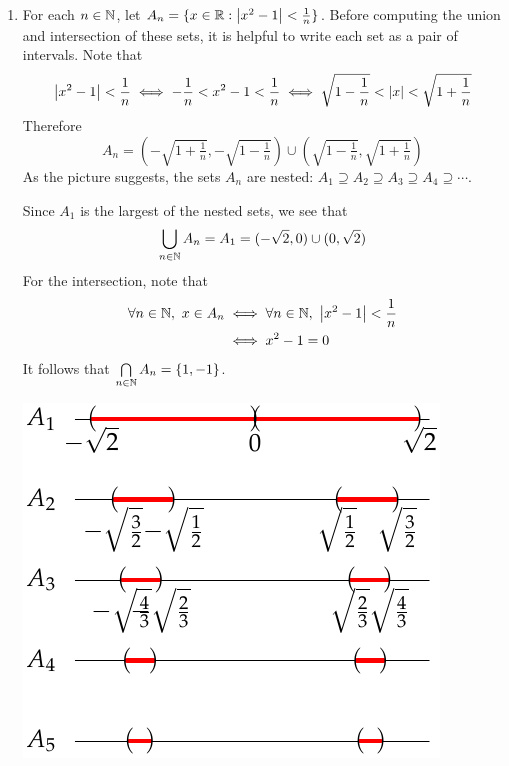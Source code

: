 \begin{examples}{}{}
\begin{enumerate}
	\item For each $n\in\mathbb{N}$, let $A_n=\{x\in\mathbb{R}:\left| x^2-1\right|<\frac 1n\}$. Before computing the union and intersection of these sets, it is helpful to write each set as a pair of intervals. Note that
	\[
		\left| x^2-1\right|<\frac 1n\iff -\frac 1n< x^2-1<\frac 1n\iff \sqrt{1-\frac 1n}< \left| x\right|< \sqrt{1+\frac 1n}
	\]
	Therefore
	\[
		A_n=\left(-\sqrt{1+\tfrac 1n},-\sqrt{1-\tfrac 1n}\right)\cup\left(\sqrt{1-\tfrac 1n},\sqrt{1+\tfrac 1n}\right)
	\]
	As the picture suggests, the sets $A_n$ are nested: $A_1\supseteq A_2\supseteq A_3\supseteq A_4\supseteq\cdots$.\par
	\begin{minipage}[t]{0.55\linewidth}\vspace{0pt}
		Since $A_1$ is the largest of the nested sets, we see that
		\[
			\bigcup\limits_{n\in\mathbb{N}}A_n=A_1=(-\sqrt{2},0)\cup(0,\sqrt{2})
		\]
		For the intersection, note that
		\begin{align*}
			\forall n\in\N,\ x\in A_n&\iff \forall n\in\N,\ \nm{x^2-1}<\frac 1n\\
			&\iff x^2-1=0
		\end{align*}
		It follows that $\bigcap\limits_{n\in\mathbb{N}}A_n=\{1,-1\}$.
	\end{minipage}
	\hfill
	\begin{minipage}[t]{0.4\linewidth}\vspace{0pt}
		\includegraphics[scale=0.5]{setsii-05-intervalex}
	\end{minipage}
	\end{enumerate}
\end{examples}



